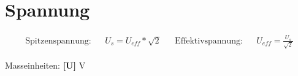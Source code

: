 \section*{Spannung}

\begin{tcolorbox}[colback=white,top=0pt]

    \begin{align*}
        \text{Spitzenspannung:}  &  & U_s = U_{eff} * \sqrt{2}       &  &
        \text{Effektivspannung:} &  & U_{eff} = \frac{U_s}{\sqrt{2}}
    \end{align*}

    \tcblower
    \begin{center}
        Masseinheiten: \textbf{[U]} V
    \end{center}
\end{tcolorbox}

